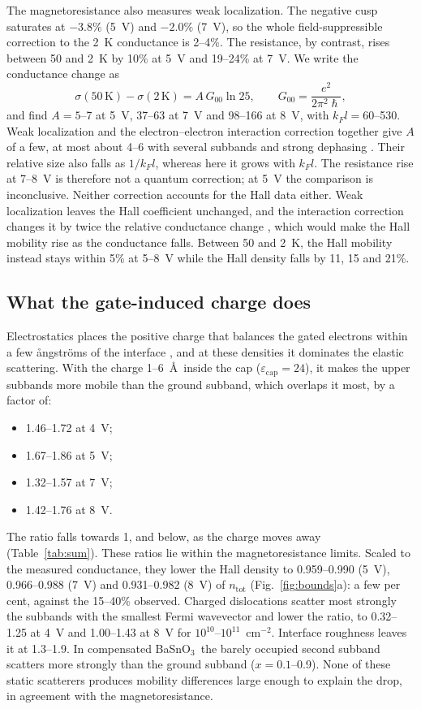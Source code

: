 \documentclass[11pt]{article}
\newcommand{\BSO}{\texorpdfstring{BaSnO$_3$}{BaSnO3}}
\newcommand{\ntot}{n_\mathrm{tot}}
\begin{document}
The magnetoresistance also measures weak localization. The negative cusp saturates at $-3.8$\% (5~V) and $-2.0$\% (7~V), so the whole field-suppressible correction to the 2~K conductance is 2--4\%. The resistance, by contrast, rises between 50 and 2~K by 10\% at 5~V and 19--24\% at 7~V. We write the conductance change as
\begin{equation}
\sigma(50\,\mathrm{K})-\sigma(2\,\mathrm{K})=A\,G_{00}\ln 25,\qquad G_{00}=\frac{e^2}{2\pi^2\hslash},
\end{equation}
and find $A=5$--7 at 5~V, 37--63 at 7~V and 98--166 at 8~V, with $k_Fl=60$--530. Weak localization and the electron--electron interaction correction together give $A$ of a few, at most about 4--6 with several subbands and strong dephasing \cite{AltshulerAronov1980,LeeRamakrishnan1985}. Their relative size also falls as $1/k_Fl$, whereas here it grows with $k_Fl$. The resistance rise at 7--8~V is therefore not a quantum correction; at 5~V the comparison is inconclusive. Neither correction accounts for the Hall data either. Weak localization leaves the Hall coefficient unchanged, and the interaction correction changes it by twice the relative conductance change \cite{AltshulerAronov1980,LeeRamakrishnan1985}, which would make the Hall mobility rise as the conductance falls. Between 50 and 2~K, the Hall mobility instead stays within 5\% at 5--8~V while the Hall density falls by 11, 15 and 21\%.

\subsection{What the gate-induced charge does}\label{sec:coulomb}
Electrostatics places the positive charge that balances the gated electrons within a few \aa ngstr\"oms of the interface \cite{OwnbyMAT02}, and at these densities it dominates the elastic scattering. With the charge 1--6~\AA\ inside the cap ($\varepsilon_\mathrm{cap}=24$), it makes the upper subbands more mobile than the ground subband, which overlaps it most, by a factor of:
\begin{itemize}
\item 1.46--1.72 at 4~V;
\item 1.67--1.86 at 5~V;
\item 1.32--1.57 at 7~V;
\item 1.42--1.76 at 8~V.
\end{itemize}
The ratio falls towards 1, and below, as the charge moves away (Table~\ref{tab:sum}). These ratios lie within the magnetoresistance limits. Scaled to the measured conductance, they lower the Hall density to 0.959--0.990 (5~V), 0.966--0.988 (7~V) and 0.931--0.982 (8~V) of $\ntot$ (Fig.~\ref{fig:bounds}a): a few per cent, against the 15--40\% observed. Charged dislocations scatter most strongly the subbands with the smallest Fermi wavevector and lower the ratio, to 0.32--1.25 at 4~V and 1.00--1.43 at 8~V for $10^{10}$--$10^{11}$~cm$^{-2}$. Interface roughness leaves it at 1.3--1.9. In compensated \BSO\ the barely occupied second subband scatters more strongly than the ground subband ($x=0.1$--0.9). None of these static scatterers produces mobility differences large enough to explain the drop, in agreement with the magnetoresistance.
\end{document}
